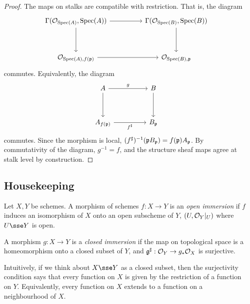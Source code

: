 \documentclass{article}
\begin{document}
\begin{proof}
    The maps on stalks are compatible with restriction. That is, the diagram
\[\begin{tikzcd}
	{\Gamma(\mcO_{\Spec(A)},\Spec(A))} && {\Gamma(\mcO_{\Spec(B)},\Spec(B))} \\
	\\
	{\mcO_{\Spec(A),f(\mfp)}} && {\mcO_{\Spec(B),\mfp}}
	\arrow[from=1-1, to=3-1]
	\arrow[from=1-1, to=1-3]
	\arrow[from=1-3, to=3-3]
	\arrow[from=3-1, to=3-3]
\end{tikzcd}\]
    commutes. Equivalently, the diagram
\[\begin{tikzcd}
	A && B \\
	\\
	{A_{f(\mfp)}} && {B_\mfp}
	\arrow["g", from=1-1, to=1-3]
	\arrow[from=1-1, to=3-1]
	\arrow[from=1-3, to=3-3]
	\arrow["{f^\sharp}"', from=3-1, to=3-3]
\end{tikzcd}\]
    commutes. Since the morphism is local, \((f^\sharp)^{-1}(\mathfrak{p} B_{\mathfrak{p}}) = f(\mathfrak{p})A_{\mathfrak{p}}\). By commutativity of the diagram, \(g^{-1} = f\), and the structure sheaf maps agree at stalk level by construction.
\end{proof}

\subsection{Housekeeping}

\begin{definition}
    Let \(X, Y\) be schemes. A morphism of schemes \(f : X \to Y\) is an \emph{open immersion} if \(f\) induces an isomorphism of \(X\) onto an open subscheme of \(Y\), \((U, \mathcal{O}_Y\vert_U)\) where \(U \sse Y\) is open.

    A morphism \(g : X \to Y\) is a \emph{closed immersion} if the map on topological space is a homeomorphism onto a closed subset of \(Y\), and \(\mathfrak{g}^\sharp : \mathcal{O}_Y \to g_*\mathcal{O}_X\) is surjective.
\end{definition}

\begin{addendum}
    Intuitively, if we think about \(X \sse Y\) as a closed subset, then the surjectivity condition says that every function on \(X\) is given by the restriction of a function on \(Y\). Equivalently, every function on \(X\) extends to a function on a neighbourhood of \(X\).
\end{addendum}
\end{document}
